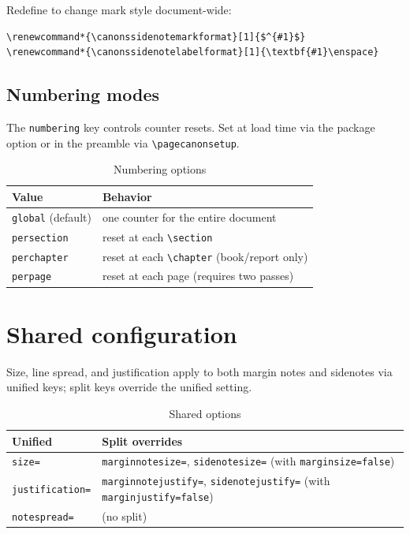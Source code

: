 \documentclass[11pt, twoside, openany]{book}
\newcommand{\cmd}[1]{\texttt{\textbackslash #1}}
\begin{document}
Redefine to change mark style document-wide:
\begin{verbatim}
\renewcommand*{\canonssidenotemarkformat}[1]{$^{#1}$}
\renewcommand*{\canonssidenotelabelformat}[1]{\textbf{#1}\enspace}
\end{verbatim}

\subsection{Numbering modes}\label{subsec:sidenotesnumbering}

The \texttt{numbering} key controls counter resets. Set at load time via the package option or in the preamble via \cmd{pagecanonsetup}.

\begin{table}[h]
	\centering
	\caption{Numbering options}
	\label{tab:numopts}
	\begin{tabular}{ll}
		\textbf{Value}            & \textbf{Behavior}                              \\
		\hline
		\texttt{global} (default) & one counter for the entire document            \\
		\texttt{persection}       & reset at each \cmd{section}                    \\
		\texttt{perchapter}       & reset at each \cmd{chapter} (book/report only) \\
		\texttt{perpage}          & reset at each page (requires two passes)       \\
	\end{tabular}
\end{table}

\section{Shared configuration}\label{sec:shared}

Size, line spread, and justification apply to both margin notes and sidenotes via unified keys; split keys override the unified setting.

\begin{table}[h]
	\centering
	\caption{Shared options}
	\label{tab:sharedopts}
	\begin{tabular}{ll}
		\textbf{Unified}        & \textbf{Split overrides}                                                                   \\
		\hline
		\texttt{size=}          & \texttt{marginnotesize=}, \texttt{sidenotesize=} (with \texttt{marginsize=false})          \\
		\texttt{justification=} & \texttt{marginnotejustify=}, \texttt{sidenotejustify=} (with \texttt{marginjustify=false}) \\
		\texttt{notespread=}    & (no split)                                                                                 \\
	\end{tabular}
\end{table}
\end{document}
